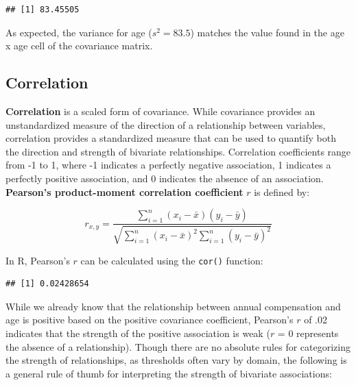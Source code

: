\documentclass[]{book}
\newenvironment{Shaded}{\begin{snugshade}}{\end{snugshade}}
\newcommand{\CommentTok}[1]{\textcolor[rgb]{0.56,0.35,0.01}{\textit{#1}}}
\newcommand{\DataTypeTok}[1]{\textcolor[rgb]{0.13,0.29,0.53}{#1}}
\newcommand{\KeywordTok}[1]{\textcolor[rgb]{0.13,0.29,0.53}{\textbf{#1}}}
\newcommand{\NormalTok}[1]{#1}
\newcommand{\OperatorTok}[1]{\textcolor[rgb]{0.81,0.36,0.00}{\textbf{#1}}}
\newcommand{\StringTok}[1]{\textcolor[rgb]{0.31,0.60,0.02}{#1}}
\begin{document}
\begin{verbatim}
## [1] 83.45505
\end{verbatim}

As expected, the variance for age (\(s^{2} = 83.5\)) matches the value found in the age x age cell of the covariance matrix.

\hypertarget{correlation}{%
\subsection{Correlation}\label{correlation}}

\textbf{Correlation} is a scaled form of covariance. While covariance provides an unstandardized measure of the direction of a relationship between variables, correlation provides a standardized measure that can be used to quantify both the direction and strength of bivariate relationships. Correlation coefficients range from -1 to 1, where -1 indicates a perfectly negative association, 1 indicates a perfectly positive association, and 0 indicates the absence of an association. \textbf{Pearson's product-moment correlation coefficient} \(r\) is defined by:

\[ r_{x,y} = \frac{\displaystyle\sum_{i=1}^{n} (x_{i}-\bar{x})(y_{i}-\bar{y})}{\sqrt{\displaystyle\sum_{i=1}^{n} (x_{i}-\bar{x})^2 \displaystyle\sum_{i=1}^{n} (y_{i}-\bar{y})^2}} \]

In R, Pearson's \(r\) can be calculated using the \texttt{cor()} function:

\begin{Shaded}
\end{Shaded}

\begin{verbatim}
## [1] 0.02428654
\end{verbatim}

While we already know that the relationship between annual compensation and age is positive based on the positive covariance coefficient, Pearson's \(r\) of .02 indicates that the strength of the positive association is weak (\(r\) = 0 represents the absence of a relationship). Though there are no absolute rules for categorizing the strength of relationships, as thresholds often vary by domain, the following is a general rule of thumb for interpreting the strength of bivariate associations:
\end{document}
